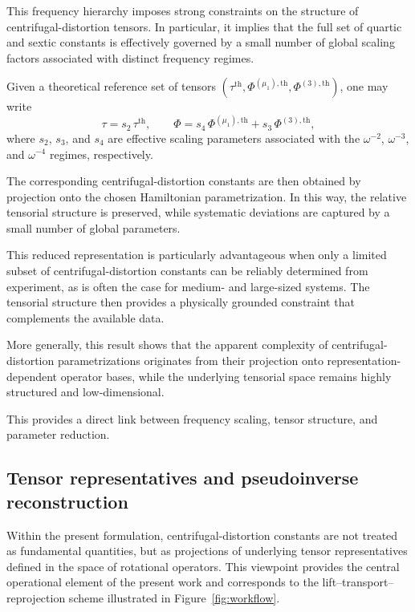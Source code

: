 \documentclass[aip,jcp,reprint,floatfix]{revtex4-2}
\begin{document}
This frequency hierarchy imposes strong constraints on the structure
of centrifugal-distortion tensors. In particular, it implies that the
full set of quartic and sextic constants is effectively governed by a
small number of global scaling factors associated with distinct
frequency regimes.

Given a theoretical reference set of tensors
$(\tau^{\mathrm{th}}, \Phi^{(\mu_1),\mathrm{th}}, \Phi^{(3),\mathrm{th}})$,
one may write
\begin{equation}
\tau = s_2 \, \tau^{\mathrm{th}}, \qquad
\Phi = s_4 \, \Phi^{(\mu_1),\mathrm{th}} + s_3 \, \Phi^{(3),\mathrm{th}},
\end{equation}
where $s_2$, $s_3$, and $s_4$ are effective scaling parameters
associated with the $\omega^{-2}$, $\omega^{-3}$, and $\omega^{-4}$
regimes, respectively.

The corresponding centrifugal-distortion constants are then obtained
by projection onto the chosen Hamiltonian parametrization. In this
way, the relative tensorial structure is preserved, while systematic
deviations are captured by a small number of global parameters.

This reduced representation is particularly advantageous when only a
limited subset of centrifugal-distortion constants can be reliably
determined from experiment, as is often the case for medium- and
large-sized systems. The tensorial structure then provides a physically
grounded constraint that complements the available data.

More generally, this result shows that the apparent complexity of
centrifugal-distortion parametrizations originates from their
projection onto representation-dependent operator bases, while the
underlying tensorial space remains highly structured and
low-dimensional.

This provides a direct link between frequency scaling, tensor
structure, and parameter reduction.


\subsection{Tensor representatives and pseudoinverse reconstruction}

Within the present formulation, centrifugal-distortion constants are
not treated as fundamental quantities, but as projections of
underlying tensor representatives defined in the space of rotational
operators. This viewpoint provides the central operational element of
the present work and corresponds to the lift--transport--reprojection
scheme illustrated in Figure~\ref{fig:workflow}.
\end{document}
